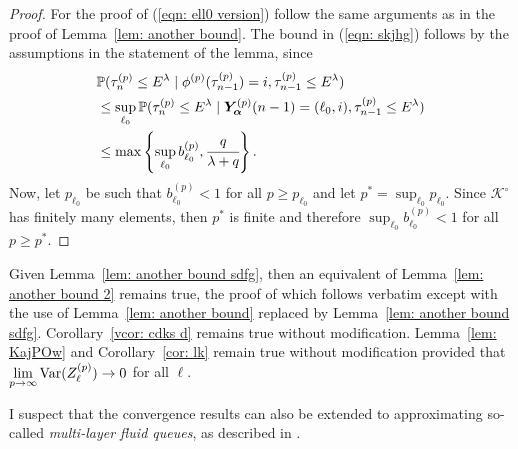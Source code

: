 \begin{proof}
	For the proof of (\ref{eqn: ell0 version}) follow the same arguments as in the proof of Lemma~\ref{lem: another bound}. The bound in (\ref{eqn: skjhg}) follows by the assumptions in the statement of the lemma, since 
	\begin{align*}
		&\mathbb P(\tau_n^{(p)}\leq E^\lambda \mid \phi^{(p)}(\tau_{n-1}^{(p)})=i, \tau_{n-1}^{(p)}\leq  E^\lambda ) 
		\\&\leq \sup_{\ell_0} \mathbb P(\tau_n^{(p)}\leq E^\lambda \mid \bm{Y}_{\bm{\alpha}}^{(p)}(n-1) = (\ell_0, i), \tau_{n-1}^{(p)}\leq  E^\lambda ) 
		\\&\leq \max\left\{\sup_{\ell_0}b_{\ell_0}^{(p)}, \cfrac{q}{\lambda + q}\right\}.
	\end{align*}
	Now, let \(p_{\ell_0}\) be such that \(b_{\ell_0}^{(p)}<1\) for all \(p\geq p_{\ell_0}\) and let \(p^*=\sup_{\ell_0}p_{\ell_0}\). Since \(\mathcal K^\circ\) has finitely many elements, then \(p^*\) is finite and therefore \(\sup_{\ell_0}b_{\ell_0}^{(p)}<1\) for all \(p\geq p^*\). 
\end{proof}
Given Lemma~\ref{lem: another bound sdfg}, then an equivalent of Lemma~\ref{lem: another bound 2} remains true, the proof of which follows verbatim except with the use of Lemma~\ref{lem: another bound} replaced by Lemma~\ref{lem: another bound sdfg}. Corollary~\ref{vcor: cdks d} remains true without modification. Lemma~\ref{lem: KajPOw} and Corollary~\ref{cor: lk} remain true without modification provided that \(\lim\limits_{p\to\infty}\mathrm{Var}(Z_\ell^{(p)})\to 0\) for all \(\ell\). 

\begin{rem}
	I suspect that the convergence results can also be extended to approximating so-called \emph{multi-layer fluid queues}, as described in \cite{bo2008}. 
\end{rem}































